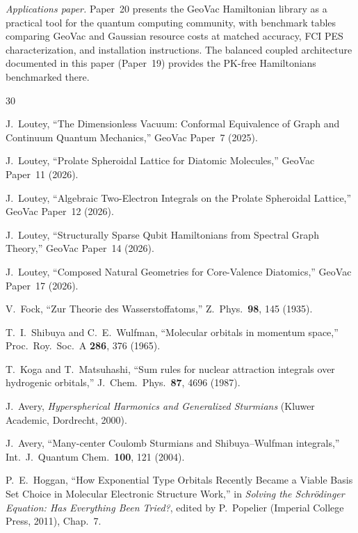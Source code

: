 \documentclass[aps,pra,twocolumn,superscriptaddress,longbibliography]{revtex4-2}
\begin{document}
\emph{Applications paper.}  Paper~20 presents the GeoVac Hamiltonian
library as a practical tool for the quantum computing community, with
benchmark tables comparing GeoVac and Gaussian resource costs at
matched accuracy, FCI PES characterization, and installation
instructions.  The balanced coupled architecture documented in this
paper (Paper~19) provides the PK-free Hamiltonians benchmarked there.



\begin{thebibliography}{30}

J.~Loutey, ``The Dimensionless Vacuum: Conformal Equivalence of
  Graph and Continuum Quantum Mechanics,'' GeoVac Paper~7 (2025).

J.~Loutey, ``Prolate Spheroidal Lattice for Diatomic Molecules,''
  GeoVac Paper~11 (2026).

J.~Loutey, ``Algebraic Two-Electron Integrals on the Prolate
  Spheroidal Lattice,'' GeoVac Paper~12 (2026).

J.~Loutey, ``Structurally Sparse Qubit Hamiltonians from Spectral
  Graph Theory,'' GeoVac Paper~14 (2026).

J.~Loutey, ``Composed Natural Geometries for Core-Valence Diatomics,''
  GeoVac Paper~17 (2026).

V.~Fock, ``Zur Theorie des Wasserstoffatoms,''
  Z.~Phys.\ \textbf{98}, 145 (1935).

T.~I.~Shibuya and C.~E.~Wulfman, ``Molecular orbitals in momentum
  space,'' Proc.\ Roy.\ Soc.\ A \textbf{286}, 376 (1965).

T.~Koga and T.~Matsuhashi, ``Sum rules for nuclear attraction
  integrals over hydrogenic orbitals,''
  J.~Chem.\ Phys.\ \textbf{87}, 4696 (1987).

J.~Avery, \emph{Hyperspherical Harmonics and Generalized Sturmians}
  (Kluwer Academic, Dordrecht, 2000).

J.~Avery, ``Many-center Coulomb Sturmians and Shibuya--Wulfman
  integrals,'' Int.\ J.\ Quantum Chem.\ \textbf{100}, 121 (2004).

P.~E.~Hoggan, ``How Exponential Type Orbitals Recently Became a Viable
  Basis Set Choice in Molecular Electronic Structure Work,'' in
  \emph{Solving the Schr\"odinger Equation: Has Everything Been
  Tried?}, edited by P.~Popelier (Imperial College Press, 2011),
  Chap.~7.


\end{thebibliography}
\end{document}
